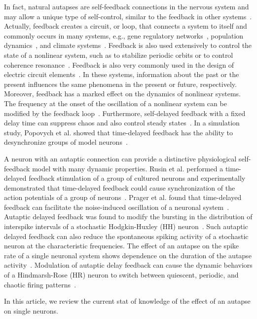 \documentclass[twocolumn,showpacs,preprintnumbers,amsmath,amssymb,pre,superscriptaddress]{revtex4-1}
\begin{document}
\begin{CJK}{UTF8}{gbsn}
In fact, natural autapses are self-feedback connections in the nervous system and may allow a unique type of self-control, similar to the feedback in other systems~\cite{ikeda}. Actually, feedback creates a circuit, or loop, that connects a system to itself and commonly occurs in many systems, e.g., gene regulatory networks~\cite{davidson,zhanghui}, population dynamics~\cite{cabrera}, and climate systems~\cite{bonan}. Feedback is also used extensively to control the state of a nonlinear system, such as to stabilize periodic orbits or to control coherence resonance~\cite{post,sethia}. Feedback is also very commonly used in the design of electric circuit elements~\cite{waik}. In these systems, information about the past or the present influences the same phenomena in the present or future, respectively. Moreover, feedback has a marked effect on the dynamics of nonlinear systems. The frequency at the onset of the oscillation of a nonlinear system can be modified by the feedback loop~\cite{Gaudreault}. Furthermore, self-delayed feedback with a fixed delay time can suppress chaos and also control steady states~\cite{Ahlborn,Balanov}. In a simulation study, Popovych et al. showed that time-delayed feedback has the ability to desynchronize groups of model neurons~\cite{popovych}.

A neuron with an autaptic connection can provide a distinctive physiological self-feedback model with many dynamic properties. Rusin et al. performed a time-delayed feedback stimulation of a group of cultured neurons and experimentally demonstrated that time-delayed feedback could cause synchronization of the action potentials of a group of neurons~\cite{rusin}. Prager et al. found that time-delayed feedback can facilitate the noise-induced oscillation of a neuronal system~\cite{prager}. Autaptic delayed feedback was found to modify the bursting in the distribution of interspike intervals of a stochastic Hodgkin-Huxley (HH) neuron~\cite{liyy}. Such autaptic delayed feedback can also reduce the spontaneous spiking activity of a stochastic neuron at the characteristic frequencies. The effect of an autapse on the spike rate of a single neuronal system shows dependence on the duration of the autapse activity~\cite{hashemi}. Modulation of autaptic delay feedback can cause the dynamic behaviors of a Hindmarsh-Rose (HR) neuron to switch between quiescent, periodic, and chaotic firing patterns~\cite{wht2014a}. 

In this article, we review the current stat of knowledge of the effect of an autapse on single neurons. 


\end{CJK}
\end{document}
